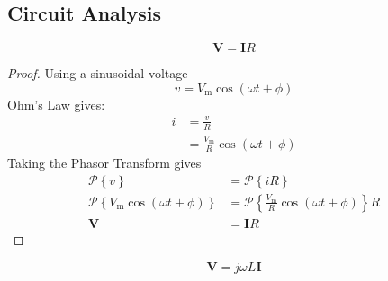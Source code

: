 \documentclass{article}
\begin{document}
\subsection{Circuit Analysis}
\begin{theorem}
    \begin{equation*}
        \symbf{V} = \symbf{I} R
    \end{equation*}
\end{theorem}
\begin{proof}
    Using a sinusoidal voltage
    \begin{equation*}
        v = V_{\mathrm{m}}\cos{\left( \omega t + \phi \right)}
    \end{equation*}
    Ohm's Law gives:
    \begin{align*}
        i & = \frac{v}{R}                                                   \\
        & = \frac{V_{\mathrm{m}}}{R} \cos{\left( \omega t + \phi \right)}
    \end{align*}
    Taking the Phasor Transform gives
    \begin{align*}
        \mathscr{P}\left\{ v \right\}                                                  & = \mathscr{P}\left\{ iR \right\}                                                              \\
        \mathscr{P}\left\{ V_{\mathrm{m}}\cos{\left( \omega t + \phi \right)} \right\} & = \mathscr{P}\left\{ \frac{V_{\mathrm{m}}}{R} \cos{\left( \omega t + \phi \right)} \right\} R \\
        \symbf{V}                                                                      & = \symbf{I} R
    \end{align*}
\end{proof}
\begin{theorem}
    \begin{equation*}
        \symbf{V} = j\omega L\symbf{I}
    \end{equation*}
\end{theorem}
\end{document}
